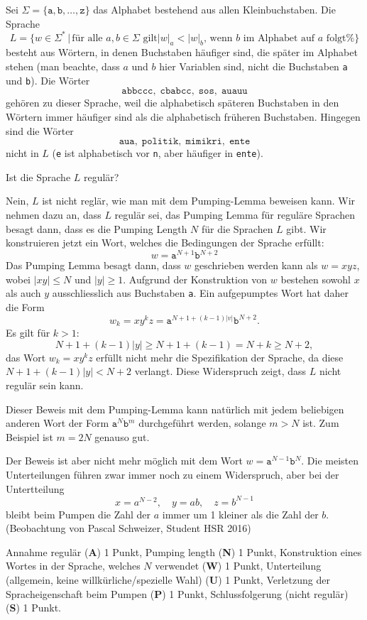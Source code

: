 Sei $\Sigma=\{\texttt{a},\texttt{b},\dots,\texttt{z}\}$ das Alphabet
bestehend aus allen Kleinbuchstaben. Die Sprache
\[
L=\{ w\in\Sigma^*
\,
|\,
\text{
für alle $a,b\in\Sigma$ gilt
$|w|_a < |w|_b$, wenn $b$ im Alphabet auf $a$ folgt%
}
\}
\]
besteht aus Wörtern, in denen Buchstaben häufiger sind, die später im
Alphabet stehen (man beachte, dass $a$ und $b$ hier Variablen sind,
nicht die Buchstaben \texttt{a} und \texttt{b}).
Die Wörter
\[
\texttt{abbccc},\;
\texttt{cbabcc},\;
\texttt{sos},\;
\texttt{auauu}
\]
gehören zu dieser Sprache, weil die alphabetisch späteren Buchstaben
in den Wörtern immer häufiger sind als die alphabetisch
früheren Buchstaben. Hingegen sind die Wörter 
\[
\texttt{aua},\;
\texttt{politik},\;
\texttt{mimikri},\;
\texttt{ente}
\]
nicht in $L$ (\texttt{e} ist alphabetisch vor \texttt{n}, aber häufiger
in \texttt{ente}).

Ist die Sprache $L$ regulär?


\begin{loesung}
Nein, $L$ ist nicht reglär, wie man mit dem Pumping-Lemma beweisen kann.
Wir nehmen dazu an, dass $L$ regulär sei, das Pumping Lemma für
reguläre Sprachen besagt dann, dass es die Pumping Length $N$ für die
Sprachen $L$ gibt.
Wir konstruieren jetzt ein Wort, welches die Bedingungen der Sprache
erfüllt:
\[
w=\texttt{a}^{N+1}\texttt{b}^{N+2}
\]
Das Pumping Lemma besagt dann, dass $w$ geschrieben werden kann als
$w=xyz$, wobei $|xy|\le N$ und $|y|\ge 1$. 
Aufgrund der Konstruktion von $w$ bestehen sowohl $x$ als auch $y$
ausschliesslich aus Buchstaben \texttt{a}.
Ein aufgepumptes Wort hat daher die Form
\[
w_k=xy^kz = \texttt{a}^{N+1+(k-1)|v|}\texttt{b}^{N+2}.
\]
Es gilt für $k > 1$:
\[
N+1+(k-1)|y|\ge N+1+(k-1)=N+k\ge N+2,
\]
das Wort $w_k=xy^kz$ erfüllt nicht mehr die Spezifikation der Sprache,
da diese $N+1+(k-1)|y| < N+2$ verlangt.
Diese Widerspruch zeigt, dass $L$ nicht regulär sein kann.
\end{loesung}

\begin{diskussion}
Dieser Beweis mit dem Pumping-Lemma kann natürlich mit jedem beliebigen
anderen Wort der Form $\texttt{a}^N\texttt{b}^{m}$ durchgeführt werden,
solange $m > N$ ist. Zum Beispiel ist $m=2N$ genauso gut.

Der Beweis ist aber nicht mehr möglich mit dem Wort
$w=\texttt{a}^{N-1}\texttt{b}^N$.
Die meisten Unterteilungen führen zwar immer noch zu einem
Widerspruch, aber bei der Untertteilung
\[
x = a^{N-2}, \quad y=ab, \quad z= b^{N-1}
\]
bleibt beim Pumpen die Zahl der $a$ immer um 1 kleiner als
die Zahl der $b$.
(Beobachtung von Pascal Schweizer, Student HSR 2016)
\end{diskussion}

\begin{bewertung}
Annahme regulär ({\bf A}) 1 Punkt,
Pumping length ({\bf N}) 1 Punkt,
Konstruktion eines Wortes in der Sprache, welches $N$ verwendet ({\bf W})
1 Punkt,
Unterteilung (allgemein, keine willkürliche/spezielle Wahl) ({\bf U}) 1 Punkt,
Verletzung der Spracheigenschaft beim Pumpen ({\bf P}) 1 Punkt,
Schluss\-folgerung (nicht regulär) ({\bf S}) 1 Punkt.
\end{bewertung}
 
